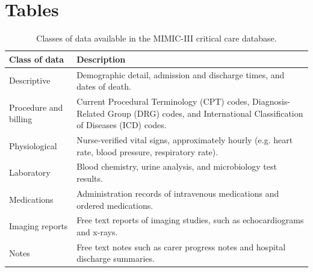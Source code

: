 \documentclass[english]{article}
\begin{document}
\section*{Tables}





\begin{center}
\begin{table}
\begin{tabular}{|l|p{8cm}|}
    \hline
    Class of data & Description \\ 
    \hline
    Descriptive & Demographic detail, admission and discharge times, and dates of death. \\ 
    \hline
    Procedure and billing & Current Procedural Terminology (CPT) codes, Diagnosis-Related Group (DRG) codes, and International Classification of Diseases (ICD) codes. \\ 
    \hline
    Physiological & Nurse-verified vital signs, approximately hourly (e.g. heart rate, blood pressure, respiratory rate). \\ 
    \hline
    Laboratory & Blood chemistry, urine analysis, and microbiology test results. \\ 
    \hline
    Medications & Administration records of intravenous medications and ordered medications. \\ 
    \hline
    Imaging reports & Free text reports of imaging studies, such as echocardiograms and x-rays. \\ 
    \hline
    Notes & Free text notes such as carer progress notes and hospital discharge summaries. \\ 
    \hline
\end{tabular}
\caption{Classes of data available in the MIMIC-III critical care database.}
\label{table:dataclasses}
\end{table}
\end{center}
\end{document}
